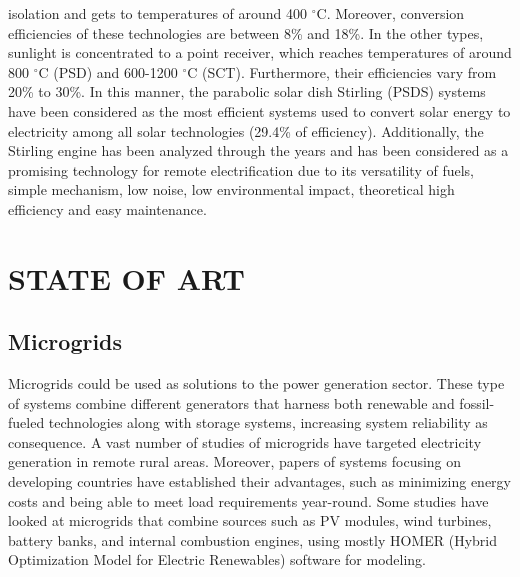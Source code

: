 \documentclass{ECOS_2019}
\begin{document}
isolation and gets to temperatures of around 400 $^\circ$C\cite{Twidell2015}. Moreover, conversion efficiencies of these technologies are between 8\% and 18\%\cite{VanSark2020}. In the other types, sunlight is concentrated to a point receiver, which reaches temperatures of around 800 $^\circ$C (PSD) and 600-1200 $^\circ$C (SCT)\cite{Islam2018}. Furthermore, their efficiencies vary from 20\% to 30\%\cite{VanSark2020}. In this manner, the parabolic solar dish Stirling (PSDS) systems have been considered as the most efficient systems used to convert solar energy to electricity among all solar technologies (29.4\% of efficiency)\cite{Punnathanam2016}. Additionally, the Stirling engine has been analyzed through the years and has been considered as a promising technology for remote electrification due to its versatility of fuels, simple mechanism, low noise, low environmental impact, theoretical high efficiency and easy maintenance\cite{Bachelier2009,Kongtragool2003,Arashnia2015,Mancini1997}.
\section{STATE OF ART}
\subsection{Microgrids}
Microgrids could be used as solutions to the power generation sector. These type of systems combine different generators that harness both renewable and fossil-fueled technologies along with storage systems, increasing system reliability as consequence. A vast number of studies of microgrids have targeted electricity generation in remote rural areas\cite{Muralikrishna2008,Munthe2009,Mandelli2016a}. Moreover, papers of systems focusing on developing countries have established their advantages, such as minimizing energy costs and being able to meet load requirements year-round\cite{Nema2009,Organ2013}. Some studies have looked at microgrids that combine sources such as PV modules, wind turbines, battery banks, and internal combustion engines, using mostly HOMER (Hybrid Optimization Model for Electric Renewables) software for modeling\cite{Shaahid2004,Sigarchian2015,Bahramara2016}.
\end{document}
